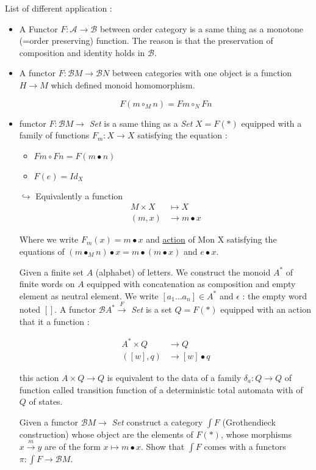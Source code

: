 \documentclass{article}
\theoremstyle{plain}
\begin{document}
  \ex List of different application :
  \begin{itemize}
    \item A Functor $F : \mathcal A \to \mathcal B$ between order category
      is a same thing as a monotone (=order preserving) function. The reason is
      that the preservation of composition and identity holds in $\mathcal B$.
    \item A functor $F : \mathcal B M \to \mathcal B N$ between categories with
      one object is a function $H \to M$ which defined monoid homomorphism.

      $$F(m \circ_M n) = F m \circ_N Fn$$

    \item  functor $F : \mathcal B M \to$ \textit{Set} is a same thing as a
      \textit{Set} $X = F(*)$ equipped with a family of functions $F_m : X \to
      X$ satisfying the equation :
      \begin{itemize}
        \item $F m \circ F n = F (m \bullet n)$
        \item $F(e) = Id_X$
      \end{itemize}
      $\hookrightarrow$ Equivalently a function
      \begin{align*}
        M \times X &\mapsto X \\
        (m, x) &\to m \bullet x
      \end{align*}

      Where we write $F_m(x) = m \bullet x$ and \underline{action} of Mon X
      satisfying the equations of $(m \bullet_M n) \bullet x = m \bullet
      (m \bullet x)$ and $e \bullet x$.

      \ex Given a finite set $A$ (alphabet) of letters. We construct the monoid
      $A^*$ of finite words on $A$  equipped with concatenation as composition
      and empty element as neutral element. We write $[a_1\ldots a_n] \in A^*$
      and $\epsilon$ : the empty word noted $[]$. A functor $\mathcal B A^*
      \xrightarrow{F}$ \textit{Set} is a set $Q = F(*)$ equipped with an action
      that it a function :

      \begin{align*}
        A^* \times Q &\to Q \\
        ([w], q) &\to [w] \bullet q
      \end{align*}

      \remk this action $A \times Q \to Q$ is equivalent to the data of  a
      family $\delta_a : Q \to Q$ of function called transition function of a
      deterministic total automata with  of $Q$ of states.

      \exe Given a functor $\mathcal B M \to$ \textit{Set} construct a category
      $\int F$ (Grothendieck construction) whose object are the elements of
      $F(*)$, whose morphisms $x \xrightarrow{m} y$ are of the form $x \mapsto m
      \bullet x$. Show that $\int F$ comes with a functors $\pi : \int F \to
      \mathcal B M$.
    \end{itemize}
\end{document}
